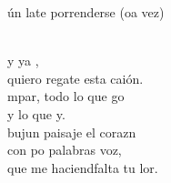 \documentclass[12pt]{article}
\begin{document}
\begin{multicols*}{2}
\begin{cancion}
\begin{chorus}
	ún late porrenderse (oa vez)\\
	\end{chorus}%
	\jump\\
	y ya , \\
	quiero regate esta caión.\\
	mpar, todo lo que go \\
	y lo que y.\\
	bujun paisaje  el corazn\\
	con po palabras  voz,\\
	que me haciendfalta tu lor.\\
\end{cancion}%


\end{multicols*}
\end{document}
